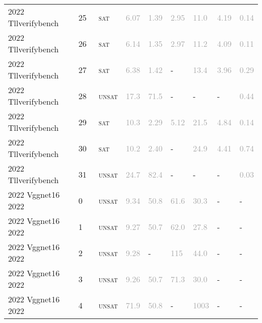 \begin{center}
{\begin{longtable}{@{}lllllllll@{}}
2022 Tllverifybench & 25 & ~\textsc{sat} & \textcolor{darkgray}{6.07} & \textcolor{darkgray}{1.39} & \textcolor{darkgray}{2.95} & \textcolor{darkgray}{11.0} & \textcolor{darkgray}{4.19} & \textcolor{darkgray}{0.14} \\
2022 Tllverifybench & 26 & ~\textsc{sat} & \textcolor{darkgray}{6.14} & \textcolor{darkgray}{1.35} & \textcolor{darkgray}{2.97} & \textcolor{darkgray}{11.2} & \textcolor{darkgray}{4.09} & \textcolor{darkgray}{0.11} \\
2022 Tllverifybench & 27 & ~\textsc{sat} & \textcolor{darkgray}{6.38} & \textcolor{darkgray}{1.42} & - & \textcolor{darkgray}{13.4} & \textcolor{darkgray}{3.96} & \textcolor{darkgray}{0.29} \\
2022 Tllverifybench & 28 & ~\textsc{unsat} & \textcolor{darkgray}{17.3} & \textcolor{darkgray}{71.5} & - & - & - & \textcolor{darkgray}{0.44} \\
2022 Tllverifybench & 29 & ~\textsc{sat} & \textcolor{darkgray}{10.3} & \textcolor{darkgray}{2.29} & \textcolor{darkgray}{5.12} & \textcolor{darkgray}{21.5} & \textcolor{darkgray}{4.84} & \textcolor{darkgray}{0.14} \\
2022 Tllverifybench & 30 & ~\textsc{sat} & \textcolor{darkgray}{10.2} & \textcolor{darkgray}{2.40} & - & \textcolor{darkgray}{24.9} & \textcolor{darkgray}{4.41} & \textcolor{darkgray}{0.74} \\
2022 Tllverifybench & 31 & ~\textsc{unsat} & \textcolor{darkgray}{24.7} & \textcolor{darkgray}{82.4} & - & - & - & \textcolor{darkgray}{0.03} \\
\midrule
2022 Vggnet16 2022 & 0 & ~\textsc{unsat} & \textcolor{darkgray}{9.34} & \textcolor{darkgray}{50.8} & \textcolor{darkgray}{61.6} & \textcolor{darkgray}{30.3} & - & - \\
2022 Vggnet16 2022 & 1 & ~\textsc{unsat} & \textcolor{darkgray}{9.27} & \textcolor{darkgray}{50.7} & \textcolor{darkgray}{62.0} & \textcolor{darkgray}{27.8} & - & - \\
2022 Vggnet16 2022 & 2 & ~\textsc{unsat} & \textcolor{darkgray}{9.28} & - & \textcolor{darkgray}{115} & \textcolor{darkgray}{44.0} & - & - \\
2022 Vggnet16 2022 & 3 & ~\textsc{unsat} & \textcolor{darkgray}{9.26} & \textcolor{darkgray}{50.7} & \textcolor{darkgray}{71.3} & \textcolor{darkgray}{30.0} & - & - \\
2022 Vggnet16 2022 & 4 & ~\textsc{unsat} & \textcolor{darkgray}{71.9} & \textcolor{darkgray}{50.8} & - & \textcolor{darkgray}{1003} & - & - \\

\end{longtable}}
\end{center}
